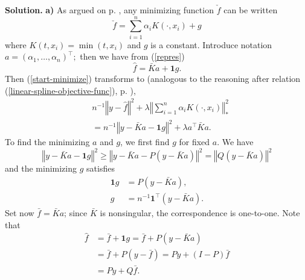 \documentclass[11pt,twoside]{article}%
\theoremstyle{change}
\newenvironment{quote-env}{\begin{quote}\sffamily }{\end{quote}}
\newenvironment{mycomments-env}[1][Mycomments]{\textbf{#1.} \begin{quote-env} }{ \end{quote-env}  \ \rule{0.5em}{0.5em}}
\begin{document}
\begin{mycomments}%


\begin{mycomments-env}
\textbf{Solution.} \textbf{a)} As argued on p.
\pageref{coroll-lin-spline-general}, any minimizing function $\check{f}$ can
be written
\begin{equation}
\check{f}=\sum_{i=1}^{n}\alpha_{i}K\left(  \cdot,x_{i}\right)
+g\label{repres}%
\end{equation}
where $K\left(  t,x_{i}\right)  =\min\left(  t,x_{i}\right)  $ and $g$ is a
constant. Introduce notation $a=\left(  \alpha_{1},\ldots,\alpha_{n}\right)
^{\top};$ then we have from (\ref{repres})
\begin{equation}
\hat{f}=\bar{K}a+\boldsymbol{1}g.\label{repres-2}%
\end{equation}
Then (\ref{start-minimize}) transforms to (analogous to the reasoning after
relation (\ref{linear-spline-objective-func}), p.
\pageref{linear-spline-objective-func}),
\begin{align*}
& n^{-1}\left\Vert y-\hat{f}\right\Vert ^{2}+\lambda\left\Vert \sum_{i=1}%
^{n}\alpha_{i}K\left(  \cdot,x_{i}\right)  \right\Vert _{\ast}^{2}\\
& =n^{-1}\left\Vert y-\bar{K}a-\boldsymbol{1}g\right\Vert ^{2}+\lambda
a^{\top}\bar{K}a.
\end{align*}
To find the minimizing $a$ and $g$, we first find $g$ for fixed $a$. We have
\[
\left\Vert y-\bar{K}a-\boldsymbol{1}g\right\Vert ^{2}\geq\left\Vert y-\bar
{K}a-P\left(  y-\bar{K}a\right)  \right\Vert ^{2}=\left\Vert Q\left(
y-\bar{K}a\right)  \right\Vert ^{2}%
\]
and the minimizing $g$ satisfies
\begin{align}
\boldsymbol{1}g  & =P\left(  y-\bar{K}a\right)  ,\label{repres-2a}\\
g  & =n^{-1}\boldsymbol{1}^{\top}\left(  y-\bar{K}a\right)  .\label{repres-3}%
\end{align}
Set now $\bar{f}=\bar{K}a$; since $\bar{K}$ is nonsingular, the correspondence
is one-to-one. Note that
\begin{align}
\hat{f}  & =\bar{f}+\boldsymbol{1}g=\bar{f}+P\left(  y-\bar{K}a\right)
\nonumber\\
& =\bar{f}+P\left(  y-\bar{f}\right)  =Py+\left(  I-P\right)  \bar
{f}\nonumber\\
& =Py+Q\bar{f}.\label{repres-4}%
\end{align}

\end{mycomments-env}
\end{mycomments}
\end{document}
